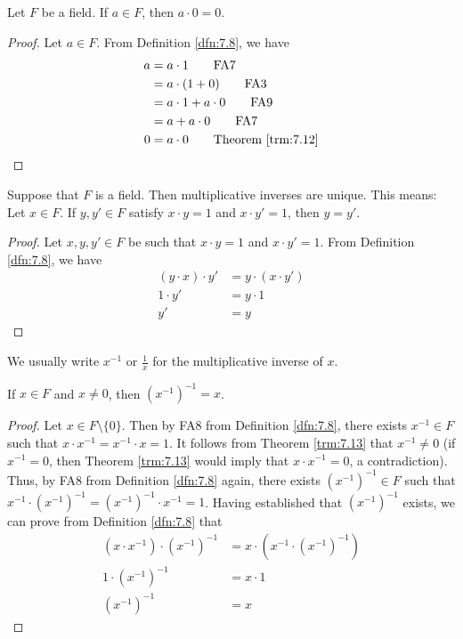 \documentclass[../main.tex]{subfiles}
\begin{document}
\begin{theorem}\label{trm:7.13}
    Let $F$ be a field. If $a\in F$, then $a\cdot 0=0$.
    \begin{proof}
        Let $a\in F$. From Definition \ref{dfn:7.8}, we have
        \begin{align*}
            a &= a\cdot 1\tag*{FA7}\\
            &= a\cdot(1+0)\tag*{FA3}\\
            &= a\cdot 1+a\cdot 0\tag*{FA9}\\
            &= a+a\cdot 0\tag*{FA7}\\
            0 &= a\cdot 0\tag*{Theorem \ref{trm:7.12}}
        \end{align*}
    \end{proof}
\end{theorem}

\begin{theorem}\label{trm:7.14}
    Suppose that $F$ is a field. Then multiplicative inverses are unique. This means: Let $x\in F$. If $y,y'\in F$ satisfy $x\cdot y=1$ and $x\cdot y'=1$, then $y=y'$.
    \begin{proof}
        Let $x,y,y'\in F$ be such that $x\cdot y=1$ and $x\cdot y'=1$. From Definition \ref{dfn:7.8}, we have
        \begin{align*}
            (y\cdot x)\cdot y' &= y\cdot (x\cdot y')\tag*{FA6}\\
            1 \cdot y' &= y\cdot 1\tag*{FA8}\\
            y' &= y\tag*{FA7}
        \end{align*}
    \end{proof}
\end{theorem}

We usually write $x^{-1}$ or $\frac{1}{x}$ for the multiplicative inverse of $x$.

\begin{corollary}\label{cly:7.15}
    If $x\in F$ and $x\neq 0$, then $(x^{-1})^{-1}=x$.
    \begin{proof}
        Let $x\in F\setminus\{0\}$. Then by FA8 from Definition \ref{dfn:7.8}, there exists $x^{-1}\in F$ such that $x\cdot x^{-1}=x^{-1}\cdot x=1$. It follows from Theorem \ref{trm:7.13} that $x^{-1}\neq 0$ (if $x^{-1}=0$, then Theorem \ref{trm:7.13} would imply that $x\cdot x^{-1}=0$, a contradiction). Thus, by FA8 from Definition \ref{dfn:7.8} again, there exists $(x^{-1})^{-1}\in F$ such that $x^{-1}\cdot(x^{-1})^{-1}=(x^{-1})^{-1}\cdot x^{-1}=1$. Having established that $(x^{-1})^{-1}$ exists, we can prove from Definition \ref{dfn:7.8} that
        \begin{align*}
            (x\cdot x^{-1})\cdot(x^{-1})^{-1} &= x\cdot(x^{-1}\cdot(x^{-1})^{-1})\tag*{FA6}\\
            1\cdot(x^{-1})^{-1} &= x\cdot 1\tag*{FA8}\\
            (x^{-1})^{-1} &= x\tag*{FA7}
        \end{align*}
    \end{proof}
\end{corollary}
\end{document}
